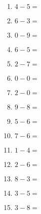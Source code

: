 \documentclass{article}
\begin{document}
\begin{multicols}{5}
\begin{enumerate}
\item $4 - 5 =$
\item $6 - 3 =$
\item $0 - 9 =$
\item $6 - 5 =$
\item $2 - 7 =$
\item $0 - 0 =$
\item $2 - 0 =$
\item $9 - 8 =$
\item $5 - 6 =$
\item $7 - 6 =$
\item $1 - 4 =$
\item $2 - 6 =$
\item $8 - 3 =$
\item $3 - 5 =$
\item $3 - 8 =$
\end{enumerate}
\end{multicols}
\end{document}
